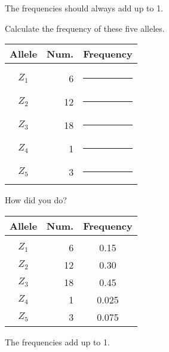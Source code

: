 \documentclass[t]{beamer}
\begin{document}
%
\begin{frame}{The frequencies should always add up to 1.}
	
	
\end{frame}
%

\begin{frame}[t]{Calculate the frequency of these five alleles.}
	
	\begin{longtable}[c]{@{}crc@{}}
		\toprule
		Allele	& Num.  & Frequency \tabularnewline
		\midrule
		& & \tabularnewline[-1ex]
		$Z_1$ & 6 & \rule{0.5in}{0.4pt} \tabularnewline[1.5ex]
		$Z_2$ & 12 & \rule{0.5in}{0.4pt} \tabularnewline[1.5ex]
		$Z_3$ & 18 & \rule{0.5in}{0.4pt} \tabularnewline[1.5ex]
		$Z_4$ & 1 & \rule{0.5in}{0.4pt} \tabularnewline[1.5ex]
		$Z_5$ & 3 & \rule{0.5in}{0.4pt} \tabularnewline[1.5ex]
		\bottomrule
	\end{longtable}
\end{frame}
%

\begin{frame}[t]{How did you do?}
	
	\begin{longtable}[c]{@{}crc@{}}
		\toprule
		Allele	& Num.  & Frequency \tabularnewline
		\midrule
		& & \tabularnewline[-1ex]
		$Z_1$ & 6 & {0.15} \tabularnewline[1.5ex]
		$Z_2$ & 12 & {0.30} \tabularnewline[1.5ex]
		$Z_3$ & 18 & {0.45} \tabularnewline[1.5ex]
		$Z_4$ & 1 & {0.025} \tabularnewline[1.5ex]
		$Z_5$ & 3 & {0.075} \tabularnewline[1.5ex]
		\bottomrule
	\end{longtable}
\end{frame}
%
\begin{frame}{The frequencies add up to 1.}
	
	
\end{frame}
\end{document}
